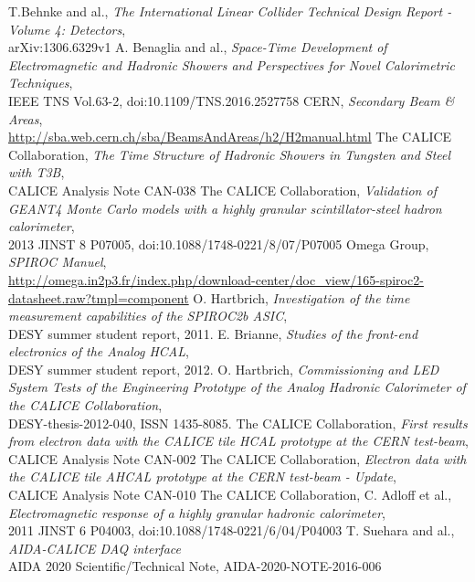 \documentclass[twoside,a4paper,11pt]{article}
\begin{document}
\clearpage

\begin{thebibliography}{10}
T.Behnke and al., \textit{The International Linear Collider Technical Design Report - Volume 4: Detectors}, \\
arXiv:1306.6329v1
	A. Benaglia and al., \textit{Space-Time Development of Electromagnetic and Hadronic Showers and Perspectives for Novel Calorimetric Techniques}, \\
	IEEE TNS Vol.63-2, doi:10.1109/TNS.2016.2527758
	CERN, \textit{Secondary Beam \& Areas}, \\
	\href{http://sba.web.cern.ch/sba/BeamsAndAreas/h2/H2manual.html}{http://sba.web.cern.ch/sba/BeamsAndAreas/h2/H2manual.html}
	The CALICE Collaboration, \textit{The Time Structure of Hadronic Showers in Tungsten and Steel with T3B}, \\
	CALICE Analysis Note CAN-038
	The CALICE Collaboration, \textit{Validation of GEANT4 Monte Carlo models with a highly granular scintillator-steel hadron calorimeter}, \\
	2013 JINST 8 P07005, doi:10.1088/1748-0221/8/07/P07005
	Omega Group, \textit{SPIROC Manuel}, \\
	\href{http://omega.in2p3.fr/index.php/download-center/doc_view/165-spiroc2-datasheet.raw?tmpl=component}{http://omega.in2p3.fr/index.php/download-center/doc\_view/165-spiroc2-datasheet.raw?tmpl=component}
	 O. Hartbrich, \textit{Investigation of the time measurement capabilities of the SPIROC2b ASIC}, \\
	 DESY summer student report, 2011.
	 E. Brianne, \textit{Studies of the front-end electronics of the Analog HCAL}, \\
	 DESY summer student report, 2012.
	 O. Hartbrich, \textit{Commissioning and LED System Tests of the Engineering Prototype of the Analog Hadronic Calorimeter of the CALICE Collaboration}, \\
	 DESY-thesis-2012-040, ISSN 1435-8085.
	 The CALICE Collaboration, \textit{First results from electron data with the CALICE tile HCAL prototype at the CERN test-beam}, \\
	 CALICE Analysis Note CAN-002
	 The CALICE Collaboration, \textit{Electron data with the CALICE tile AHCAL prototype at the CERN test-beam - Update}, \\
	 CALICE Analysis Note CAN-010
	 The CALICE Collaboration, C. Adloff et al., \textit{Electromagnetic response of a highly granular hadronic calorimeter}, \\
	 2011 JINST 6 P04003, doi:10.1088/1748-0221/6/04/P04003
	 T. Suehara and al., \textit{AIDA-CALICE DAQ interface} \\
	 AIDA 2020 Scientific/Technical Note, AIDA-2020-NOTE-2016-006
\end{thebibliography}
\end{document}
